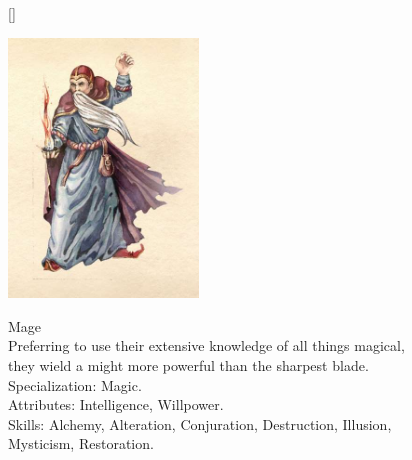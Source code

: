 \documentclass[12pt]{book}
\begin{document}
\begin{figure}[H]
[\FBwidth]
{\caption*{Mage\\

Preferring to use their extensive knowledge of all things magical, they wield a might more powerful than the sharpest blade.\\

Specialization: Magic.\\

Attributes: Intelligence, Willpower.\\

Skills: Alchemy, Alteration, Conjuration, Destruction, Illusion, Mysticism, Restoration.}\label{fig:test}}
{\includegraphics[width=0.45\textwidth]{Mageclass.png}}
\end{figure}
\end{document}
